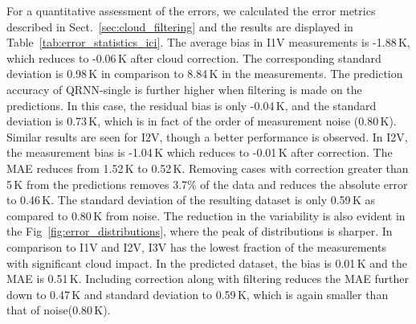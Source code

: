 \documentclass[amt, manuscript]{copernicus}
\begin{document}
For a quantitative assessment of the errors, we calculated the error metrics described in Sect.~\ref{sec:cloud_filtering} and the results are displayed in Table~\ref{tab:error_statistics_ici}. The average bias in I1V measurements is -1.88\,K, which reduces to -0.06\,K after cloud correction. The corresponding standard deviation is 0.98\,K in comparison to 8.84\,K in the measurements. The prediction accuracy of QRNN-single is further higher when filtering is made on the predictions. In this case, the residual bias is only -0.04\,K, and the standard deviation is 0.73\,K, which is in fact of the order of measurement noise (0.80\,K). Similar results are seen for I2V, though a better performance is observed. In I2V, the measurement bias is -1.04\,K which reduces to -0.01\,K after correction. The MAE reduces from 1.52\,K to 0.52\,K. Removing cases with correction greater than 5\,K from the predictions removes 3.7\% of the data and reduces the absolute error to 0.46\,K. The standard deviation of the resulting dataset is only 0.59\,K as compared to 0.80\,K from noise. The reduction in the variability is also evident in the Fig~\ref{fig:error_distributions}, where the peak of distributions is sharper. In comparison to I1V and I2V, I3V has the lowest fraction of the measurements with significant cloud impact. In the predicted dataset, the bias is 0.01\,K and the MAE is 0.51\,K. Including correction along with filtering reduces the MAE further down to 0.47\,K and standard deviation to 0.59\,K, which is again smaller than that of noise(0.80\,K).  
\end{document}
